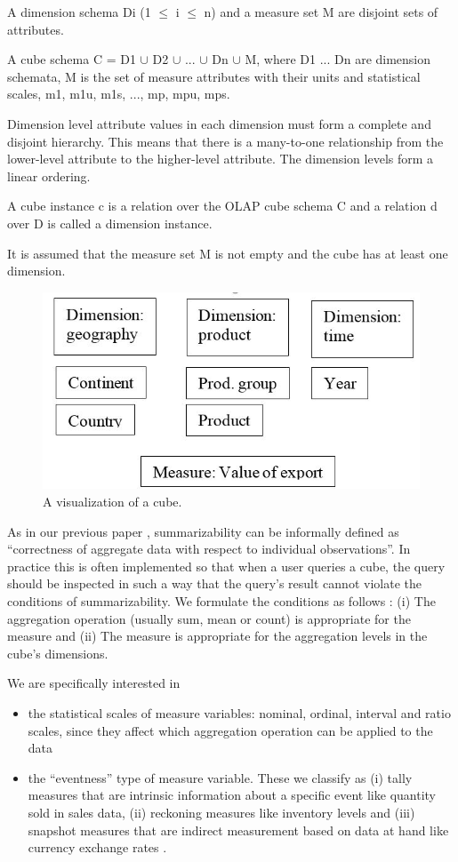 \documentclass[USenglish,twocolumn]{article}
\begin{document}
A dimension schema Di (1 $\leq$ i $\leq$ n) and a measure set M are disjoint sets
of attributes.

A cube schema C = D1 $\cup$ D2 $\cup$ ... $\cup$ Dn $\cup$ M, where D1 ... Dn are dimension
schemata, M is the set of measure attributes with their units and
statistical scales, m1, m1u, m1s, ..., mp, mpu, mps.

Dimension level attribute values in each dimension must form a complete
and disjoint hierarchy. This means that there is a many-to-one
relationship from the lower-level attribute to the higher-level
attribute. The dimension levels form a linear ordering.

A cube instance c is a relation over the OLAP cube schema C and a
relation d over D is called a dimension instance.

It is assumed that the measure set M is not empty and the cube has at
least one dimension.

\begin{figure}
\includegraphics[scale=0.5]{fig1.JPG}
\caption{A visualization of a cube.\label{fig1}}
\end{figure}

As in our previous paper \cite{Nii181}, summarizability can be informally defined as
``correctness of aggregate data with respect to individual
observations''. In practice this is often implemented so that when a
user queries a cube, the query should be inspected in such a way that
the query's result cannot violate the conditions of summarizability. We
formulate the conditions as follows \cite{Tap14}: (i) The aggregation operation
(usually sum, mean or count) is appropriate for the measure and (ii) The
measure is appropriate for the aggregation levels in the cube's
dimensions.

We are specifically interested in

\begin{itemize}
\item
  the statistical scales of measure variables: nominal, ordinal,
  interval and ratio scales, since they affect which aggregation
  operation can be applied to the data
\item
  the ``eventness'' type of measure variable. These we classify as (i)
  tally measures that are intrinsic information about a specific event
  like quantity sold in sales data, (ii) reckoning measures like
  inventory levels and (iii) snapshot measures that are indirect
  measurement based on data at hand like currency exchange rates \cite{Tap14}.
\end{itemize}
\end{document}
